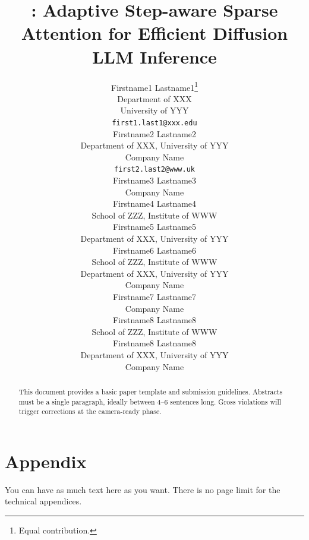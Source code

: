 \documentclass{article}
\title{\name: Adaptive Step-aware Sparse Attention for Efficient Diffusion LLM Inference}
\author{%
  Firstname1 Lastname1\thanks{Equal contribution.} \\
  Department of XXX\\
  University of YYY\\
  \texttt{first1.last1@xxx.edu} \\
  \And
  Firstname2 Lastname2\footnotemark[1] \\
  Department of XXX, University of YYY\\
  Company Name\\
  \texttt{first2.last2@www.uk} \\
  \And
  Firstname3 Lastname3 \\
  Company Name \\
  \And
  Firstname4 Lastname4 \\
  School of ZZZ, Institute of WWW \\
  \And
  Firstname5 Lastname5 \\
  Department of XXX, University of YYY \\
  \And
  Firstname6 Lastname6 \\
  School of ZZZ, Institute of WWW \\
  Department of XXX, University of YYY \\
  Company Name \\
  \And
  Firstname7 Lastname7 \\
  Company Name \\
  \And
  Firstname8 Lastname8 \\
  School of ZZZ, Institute of WWW \\
  \And
  Firstname8 Lastname8 \\
  Department of XXX, University of YYY \\
  Company Name \\
}
\theoremstyle{plain}
\theoremstyle{definition}
\theoremstyle{remark}
\begin{document}
\maketitle

\begin{abstract}
  This document provides a basic paper template and submission guidelines.
  Abstracts must be a single paragraph, ideally between 4--6 sentences long.
  Gross violations will trigger corrections at the camera-ready phase.
\end{abstract}










\appendix
\section{Appendix}

You can have as much text here as you want. There is no page limit for the
technical appendices.


\newpage

\end{document}
